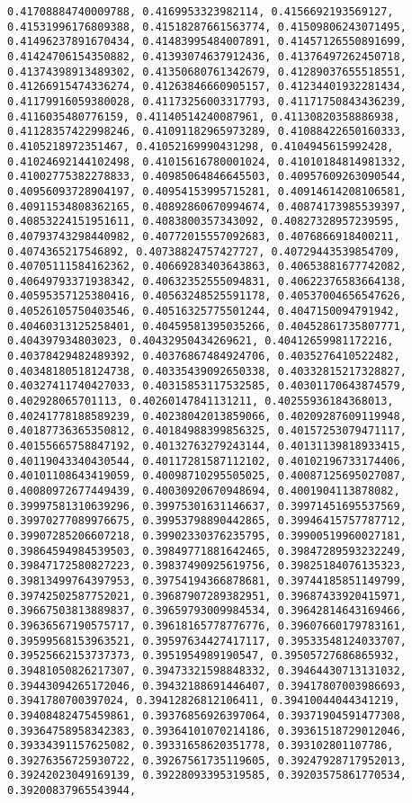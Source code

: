 \documentclass[11pt]{article}
\begin{document}
\begin{Verbatim}[commandchars=\\\{\}]
0.41708884740009788, 0.4169953323982114, 0.4156692193569127, 0.41531996176809388, 0.41518287661563774, 0.41509806243071495, 0.41496237891670434, 0.41483995484007891, 0.41457126550891699, 0.41424706154350882, 0.41393074637912436, 0.41376497262450718, 0.41374398913489302, 0.41350680761342679, 0.41289037655518551, 0.41266915474336274, 0.41263846660905157, 0.41234401932281434, 0.41179916059380028, 0.41173256003317793, 0.41171750843436239, 0.4116035480776159, 0.41140514240087961, 0.41130820358886938, 0.41128357422998246, 0.41091182965973289, 0.41088422650160333, 0.4105218972351467, 0.41052169990431298, 0.4104945615992428, 0.41024692144102498, 0.41015616780001024, 0.41010184814981332, 0.41002775382278833, 0.40985064846645503, 0.40957609263090544, 0.40956093728904197, 0.40954153995715281, 0.40914614208106581, 0.40911534808362165, 0.40892860670994674, 0.40874173985539397, 0.40853224151951611, 0.4083800357343092, 0.40827328957239595, 0.40793743298440982, 0.40772015557092683, 0.4076866918400211, 0.4074365217546892, 0.40738824757427727, 0.40729443539854709, 0.40705111584162362, 0.40669283403643863, 0.40653881677742082, 0.40649793371938342, 0.40632352555094831, 0.40622376583664138, 0.40595357125380416, 0.40563248525591178, 0.40537004656547626, 0.40526105750403546, 0.40516325775501244, 0.4047150094791942, 0.40460313125258401, 0.40459581395035266, 0.40452861735807771, 0.404397934803023, 0.40432950434269621, 0.40412659981172216, 0.40378429482489392, 0.40376867484924706, 0.4035276410522482, 0.40348180518124738, 0.40335439092650338, 0.40332815217328827, 0.40327411740427033, 0.40315853117532585, 0.40301170643874579, 0.402928065701113, 0.40260147841131211, 0.40255936184368013, 0.40241778188589239, 0.40238042013859066, 0.40209287609119948, 0.40187736365350812, 0.40184988399856325, 0.40157253079471117, 0.40155665758847192, 0.40132763279243144, 0.40131139818933415, 0.40119043340430544, 0.40117281587112102, 0.40102196733174406, 0.40101108643419059, 0.40098710295505025, 0.40087125695027087, 0.40080972677449439, 0.40030920670948694, 0.4001904113878082, 0.39997581310639296, 0.39975301631146637, 0.39971451695537569, 0.39970277089976675, 0.39953798890442865, 0.39946415757787712, 0.39907285206607218, 0.39902330376235795, 0.39900519960027181, 0.39864594984539503, 0.39849771881642465, 0.39847289593232249, 0.39847172580827223, 0.39837490925619756, 0.39825184076135323, 0.39813499764397953, 0.39754194366878681, 0.39744185851149799, 0.39742502587752021, 0.39687907289382951, 0.39687433920415971, 0.39667503813889837, 0.39659793009984534, 0.39642814643169466, 0.39636567190575717, 0.39618165778776776, 0.39607660179783161, 0.39599568153963521, 0.39597634427417117, 0.39533548124033707, 0.39525662153737373, 0.3951954989190547, 0.39505727686865932, 0.39481050826217307, 0.39473321598848332, 0.39464430713131032, 0.39443094265172046, 0.39432188691446407, 0.39417807003986693, 0.3941780700397024, 0.39412826812106411, 0.39410044044341219, 0.39408482475459861, 0.39376856926397064, 0.39371904591477308, 0.39364758958342383, 0.39364101070214186, 0.39361518729012046, 0.39334391157625082, 0.39331658620351778, 0.393102801107786, 0.39276356725930722, 0.39267561735119605, 0.39247928717952013, 0.39242023049169139, 0.39228093395319585, 0.39203575861770534, 0.39200837965543944, 
\end{Verbatim}
\end{document}
